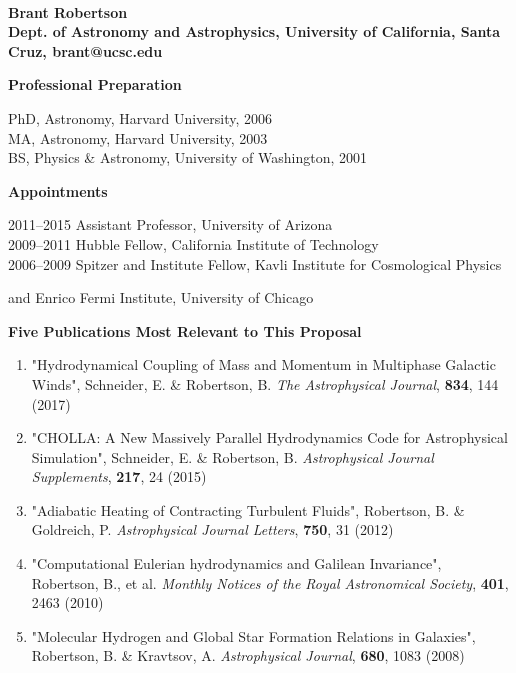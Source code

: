 \documentclass[11pt,letterpaper,english]{article}
\begin{document}
\setlength{\parindent}{0in} %

\pagestyle{fancy}   \renewcommand{%
\headrulewidth}{0.0pt}



\\
{\bf Brant Robertson}\\
{\bf Dept. of Astronomy and Astrophysics, University of California, Santa Cruz, brant@ucsc.edu} \smallskip

\begin{flushleft} {\bf Professional Preparation}
{\parindent 16pt

PhD, Astronomy, Harvard University, 2006 \\ 
MA, Astronomy, Harvard University, 2003 \\ 
BS, Physics \& Astronomy, University of Washington, 2001 \\ 
}

\vspace{.04in}
{\bf Appointments}
{\parindent 16pt

2011--2015 Assistant Professor, University of Arizona \\ 
2009--2011 Hubble Fellow, California Institute of Technology \\ 
2006--2009 Spitzer and Institute Fellow, Kavli Institute for Cosmological Physics\\ 
}
{\parindent 70pt
and Enrico Fermi Institute, University of Chicago \\ 
}

\vspace{.04in}
{\bf Five Publications Most Relevant to This Proposal}
\vspace{-6pt}
\begin{enumerate} \itemsep1pt \parskip0pt 
\item "Hydrodynamical Coupling of Mass and Momentum in Multiphase Galactic Winds", Schneider, E. \& Robertson, B. \textit{The Astrophysical Journal}, {\bf 834}, 144 (2017)\\ 
\item "CHOLLA: A New Massively Parallel Hydrodynamics Code for Astrophysical Simulation", Schneider, E. \& Robertson, B. \textit{Astrophysical Journal Supplements}, {\bf 217}, 24 (2015)\\ 
\item "Adiabatic Heating of Contracting Turbulent Fluids", Robertson, B. \& Goldreich, P. \textit{Astrophysical Journal Letters}, {\bf 750}, 31 (2012)\\ 
\item "Computational Eulerian hydrodynamics and Galilean Invariance", Robertson, B., et al. \textit{Monthly Notices of the Royal Astronomical Society}, {\bf 401}, 2463 (2010)\\ 
\item "Molecular Hydrogen and Global Star Formation Relations in Galaxies", Robertson, B. \& Kravtsov, A. \textit{Astrophysical Journal}, {\bf 680}, 1083 (2008)\\ 
\end{enumerate} 


\end{flushleft}
\end{document}
